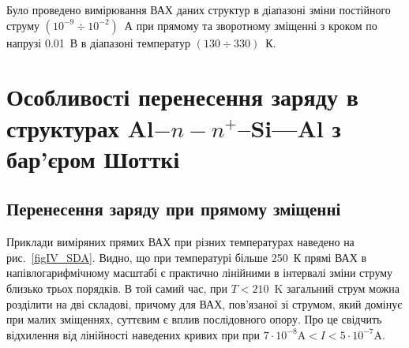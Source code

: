 



Було проведено вимірювання ВАХ даних структур в діапазоні зміни постійного струму $(10^{-9}\div10^{-2})$~А при
прямому та зворотному зміщенні з кроком по напрузі 0.01~В в діапазоні температур $(130\div330)$~К.


\section{Особливості перенесення заряду в структурах Al$-n-n^+$--Si---Al з бар'єром Шотткі\label{MSSi_Non}}
\subsection{Перенесення заряду при прямому зміщенні\label{sbMSSi_NonF}}


Приклади виміряних прямих ВАХ при різних температурах наведено на рис.~\ref{figIV_SDA}.
Видно, що при температурі більше 250~К прямі ВАХ в напівлогарифмічному масштабі є практично лінійними в інтервалі зміни струму близько трьох порядків.
В той самий час, при $T<210$~K загальний струм можна розділити на дві складові, причому для ВАХ, пов'язаної зі струмом,
який домінує при малих зміщеннях, суттєвим є вплив послідовного опору.
Про це свідчить відхилення від лінійності наведених кривих при при $7\cdot10^{-8}\mbox{A}<I<5\cdot10^{-7}\mbox{A}$.

